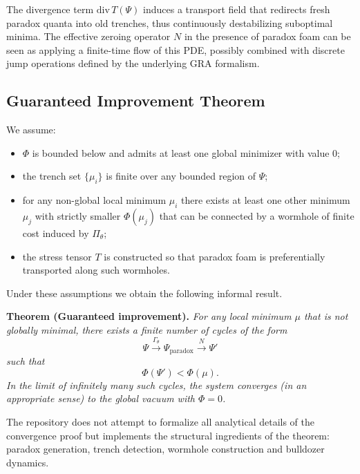\documentclass[11pt]{article}
\begin{document}
The divergence term $\mathrm{div}\,T(\Psi)$ induces a transport field that redirects fresh paradox quanta into old trenches, thus continuously destabilizing suboptimal minima. 
The effective zeroing operator $N$ in the presence of paradox foam can be seen as applying a finite-time flow of this PDE, possibly combined with discrete jump operations defined by the underlying GRA formalism.

\subsection*{Guaranteed Improvement Theorem}

We assume:
\begin{itemize}
    \item[(i)] $\Phi$ is bounded below and admits at least one global minimizer with value $0$;
    \item[(ii)] the trench set $\{\mu_i\}$ is finite over any bounded region of $\Psi$;
    \item[(iii)] for any non-global local minimum $\mu_i$ there exists at least one other minimum $\mu_j$ with strictly smaller $\Phi(\mu_j)$ that can be connected by a wormhole of finite cost induced by $\Pi_{\theta}$;
    \item[(iv)] the stress tensor $T$ is constructed so that paradox foam is preferentially transported along such wormholes.
\end{itemize}

Under these assumptions we obtain the following informal result.

\medskip
\noindent\textbf{Theorem (Guaranteed improvement).}
\emph{For any local minimum $\mu$ that is not globally minimal, there exists a finite number of cycles of the form}
\begin{equation}
    \Psi \xrightarrow{\Gamma_{\theta}} \Psi_{\text{paradox}} 
    \xrightarrow{N} \Psi'
\end{equation}
\emph{such that}
\begin{equation}
    \Phi(\Psi') < \Phi(\mu).
\end{equation}
\emph{In the limit of infinitely many such cycles, the system converges (in an appropriate sense) to the global vacuum with $\Phi = 0$.}

\medskip

The repository does not attempt to formalize all analytical details of the convergence proof but implements the structural ingredients of the theorem: paradox generation, trench detection, wormhole construction and bulldozer dynamics.
\end{document}
